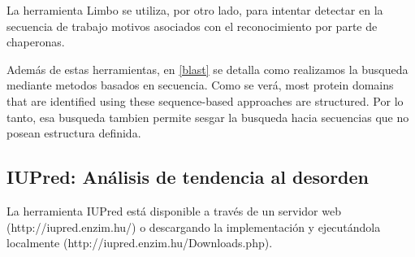 La herramienta Limbo se utiliza, por otro lado, para intentar detectar en la secuencia de trabajo motivos asociados con el reconocimiento por parte de chaperonas.

Además de estas herramientas, en \ref{blast} se detalla como realizamos la busqueda mediante metodos basados en secuencia. 
Como se verá, most protein domains that are identified using these sequence-based approaches are structured.
Por lo tanto, esa busqueda tambien permite sesgar la busqueda hacia secuencias que no posean estructura definida.

















\subsection{IUPred: Análisis de tendencia al desorden}

La herramienta IUPred está disponible a través de un servidor web (http://iupred.enzim.hu/) o descargando la implementación y ejecutándola localmente (http://iupred.enzim.hu/Downloads.php).   


